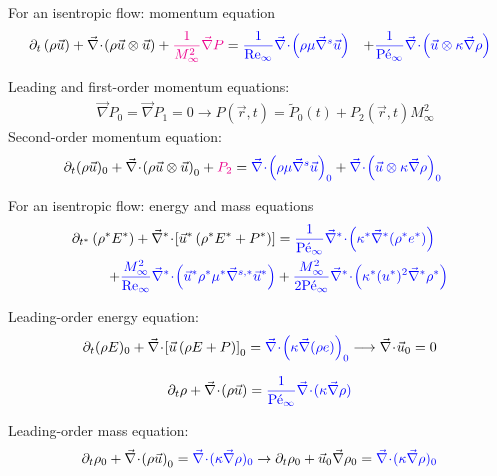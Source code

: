 \documentclass[xcolor=dvipsnames,10pt]{beamer}
\renewcommand{\Re}{\textrm{Re}}
\newcommand{\Pe}{\textrm{P\'e}}
\renewcommand{\div}{\vec{\nabla}\! \cdot \!}
\newcommand{\grad}{\vec{\nabla}}
\newcommand{\divv}[1]{\vec{\nabla}^{#1}\! \cdot \!}
\newcommand{\gradd}[1]{\vec{\nabla}^{#1}}
\begin{document}
\begin{frame}{For an isentropic flow: momentum equation}
\begin{align}
\partial_{t} \left( \rho \vec{u} \right) 
+ \div \left( \rho \vec{u}\otimes \vec{u} \right) 
+ \textcolor{magenta}{\frac{1}{M_\infty^2}\grad  P}
&= 
\textcolor{blue}{\frac{1}{\Re_\infty} \div \left( \rho \mu \gradd{s} \vec{u} \right)}
&+
\textcolor{blue}{\frac{1}{\Pe_\infty} \div \left(\vec{u}\otimes \kappa \grad  \rho \right)} \nonumber
\end{align}
\begin{block}{}
Leading and first-order momentum equations:
\begin{align}
&\grad P_0 = \grad P_1 = 0 \longrightarrow P(\vec{r}, t) = \tilde{P}_0(t) + P_2(\vec{r}, t) M_\infty^2\nonumber 
\end{align}
Second-order momentum equation:
\begin{align}
&\partial_t (\rho \vec{u} )_0 + \div \left( \rho \vec{u}\otimes \vec{u} \right)_0 + \textcolor{magenta}{P_2} = \textcolor{blue}{ \div \left( \rho \mu \gradd{s} \vec{u} \right)_0}
+
\textcolor{blue}{ \div \left(\vec{u}\otimes \kappa \grad  \rho \right)_0} \nonumber
\end{align}
\end{block}
\end{frame}
\begin{frame}{For an isentropic flow: energy and mass equations}
\begin{align}
\partial_{t^*} \left( \rho^* E^* \right) 
+ \divv{*}  \left[ \vec{u}^* \left( \rho^* E^* + P^* \right) \right] 
&=
\textcolor{blue}{\frac{1}{\Pe_\infty} \divv{*}  \left( \kappa^*  \gradd{*} (\rho^* e^*) \right)} \nonumber \\
+
\textcolor{blue}{\frac{M_\infty^2}{\Re_\infty} \divv{*}  \left( \vec{u}^* \rho^* \mu^* \gradd{s,*} \vec{u}^* \right)}
&+ 
\textcolor{blue}{\frac{M_\infty^2}{2 \Pe_\infty} \divv{*}  \left(\kappa^* (u^*)^2 \gradd{*} \rho^* \right)} \nonumber
\end{align}
\begin{block}{}
Leading-order energy equation:
\begin{align}
\partial_t ( \rho E )_0 + \div \left[ \vec{u} \left( \rho E + P \right) \right]_0 = \textcolor{blue}{\div \left( \kappa  \grad (\rho e) \right)_0} \longrightarrow \div \vec{u}_0 = 0 \nonumber 
\end{align}
\end{block}
\begin{align}
\partial_{t} \rho+ \div  \left(  \rho \vec{u}  \right) = \textcolor{blue}{\frac{1}{\Pe_\infty} \div  ( \kappa \grad \rho )} \nonumber
\end{align}
\begin{block}{}
Leading-order mass equation:
\begin{align}
\partial_{t} \rho_0+ \div  \left(  \rho \vec{u}  \right)_0 = \textcolor{blue}{ \div ( \kappa \grad \rho )_0} \to \partial_t \rho_0 + \vec{u}_0 \grad \rho_0 = \textcolor{blue}{ \div ( \kappa \grad \rho )_0}\nonumber
\end{align}
\end{block}
\end{frame}
\end{document}
